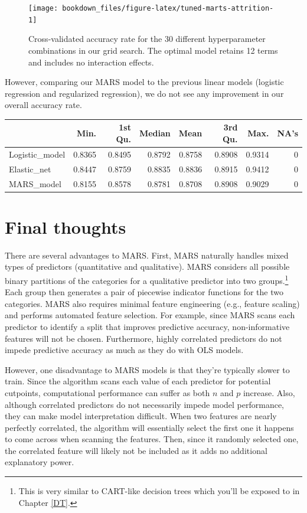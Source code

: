 \documentclass[]{krantz}
\begin{document}
\begin{figure}

{\centering \texttt{[image: bookdown\_files/figure-latex/tuned-marts-attrition-1]} 

}

\caption{Cross-validated accuracy rate for the 30 different hyperparameter combinations in our grid search. The optimal model retains 12 terms and includes no interaction effects.}\label{fig:tuned-marts-attrition}
\end{figure}

However, comparing our MARS model to the previous linear models (logistic regression and regularized regression), we do not see any improvement in our overall accuracy rate.

\begin{tabular}{l|r|r|r|r|r|r|r}
\hline
  & Min. & 1st Qu. & Median & Mean & 3rd Qu. & Max. & NA's\\
\hline
Logistic\_model & 0.8365 & 0.8495 & 0.8792 & 0.8758 & 0.8908 & 0.9314 & 0\\
\hline
Elastic\_net & 0.8447 & 0.8759 & 0.8835 & 0.8836 & 0.8915 & 0.9412 & 0\\
\hline
MARS\_model & 0.8155 & 0.8578 & 0.8781 & 0.8708 & 0.8908 & 0.9029 & 0\\
\hline
\end{tabular}

\hypertarget{final-thoughts-3}{%
\section{Final thoughts}\label{final-thoughts-3}}

There are several advantages to MARS. First, MARS naturally handles mixed types of predictors (quantitative and qualitative). MARS considers all possible binary partitions of the categories for a qualitative predictor into two groups.\footnote{This is very similar to CART-like decision trees which you'll be exposed to in Chapter \ref{DT}.} Each group then generates a pair of piecewise indicator functions for the two categories. MARS also requires minimal feature engineering (e.g., feature scaling) and performs automated feature selection. For example, since MARS scans each predictor to identify a split that improves predictive accuracy, non-informative features will not be chosen. Furthermore, highly correlated predictors do not impede predictive accuracy as much as they do with OLS models.

However, one disadvantage to MARS models is that they're typically slower to train. Since the algorithm scans each value of each predictor for potential cutpoints, computational performance can suffer as both \(n\) and \(p\) increase. Also, although correlated predictors do not necessarily impede model performance, they can make model interpretation difficult. When two features are nearly perfectly correlated, the algorithm will essentially select the first one it happens to come across when scanning the features. Then, since it randomly selected one, the correlated feature will likely not be included as it adds no additional explanatory power.
\end{document}
